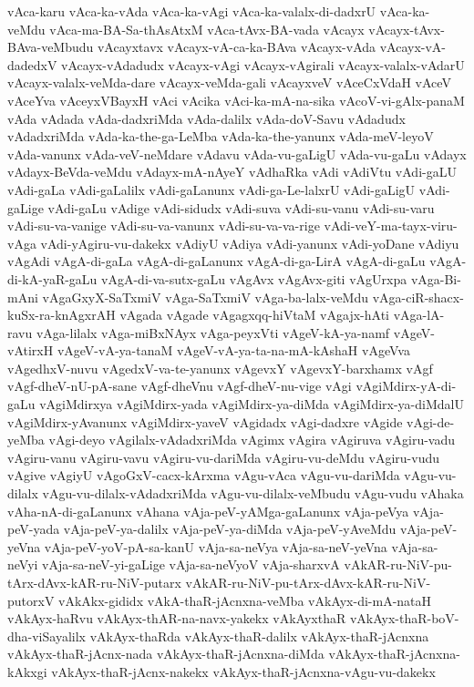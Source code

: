 {vAca-karu
vAca-ka-vAda
vAca-ka-vAgi
vAca-ka-valalx-di-dadxrU
vAca-ka-veMdu
vAca-ma-BA-Sa-thAsAtxM
vAca-tAvx-BA-vada
vAcayx
vAcayx-tAvx-BAva-veMbudu
vAcayxtavx
vAcayx-vA-ca-ka-BAva
vAcayx-vAda
vAcayx-vA-dadedxV
vAcayx-vAdadudx
vAcayx-vAgi
vAcayx-vAgirali
vAcayx-valalx-vAdarU
vAcayx-valalx-veMda-dare
vAcayx-veMda-gali
vAcayxveV
vAceCxVdaH
vAceV
vAceYva
vAceyxVBayxH
vAci
vAcika
vAci-ka-mA-na-sika
vAcoV-vi-gAlx-panaM
vAda
vAdada
vAda-dadxriMda
vAda-dalilx
vAda-doV-Savu
vAdadudx
vAdadxriMda
vAda-ka-the-ga-LeMba
vAda-ka-the-yanunx
vAda-meV-leyoV
vAda-vanunx
vAda-veV-neMdare
vAdavu
vAda-vu-gaLigU
vAda-vu-gaLu
vAdayx
vAdayx-BeVda-veMdu
vAdayx-mA-nAyeY
vAdhaRka
vAdi
vAdiVtu
vAdi-gaLU
vAdi-gaLa
vAdi-gaLalilx
vAdi-gaLanunx
vAdi-ga-Le-lalxrU
vAdi-gaLigU
vAdi-gaLige
vAdi-gaLu
vAdige
vAdi-sidudx
vAdi-suva
vAdi-su-vanu
vAdi-su-varu
vAdi-su-va-vanige
vAdi-su-va-vanunx
vAdi-su-va-va-rige
vAdi-veY-ma-tayx-viru-vAga
vAdi-yAgiru-vu-dakekx
vAdiyU
vAdiya
vAdi-yanunx
vAdi-yoDane
vAdiyu
vAgAdi
vAgA-di-gaLa
vAgA-di-gaLanunx
vAgA-di-ga-LirA
vAgA-di-gaLu
vAgA-di-kA-yaR-gaLu
vAgA-di-va-sutx-gaLu
vAgAvx
vAgAvx-giti
vAgUrxpa
vAga-Bi-mAni
vAgaGxyX-SaTxmiV
vAga-SaTxmiV
vAga-ba-lalx-veMdu
vAga-ciR-shacx-kuSx-ra-knAgxrAH
vAgada
vAgade
vAgagxqq-hiVtaM
vAgajx-hAti
vAga-lA-ravu
vAga-lilalx
vAga-miBxNAyx
vAga-peyxVti
vAgeV-kA-ya-namf
vAgeV-vAtirxH
vAgeV-vA-ya-tanaM
vAgeV-vA-ya-ta-na-mA-kAshaH
vAgeVva
vAgedhxV-nuvu
vAgedxV-va-te-yanunx
vAgevxY
vAgevxY-barxhamx
vAgf
vAgf-dheV-nU-pA-sane
vAgf-dheVnu
vAgf-dheV-nu-vige
vAgi
vAgiMdirx-yA-di-gaLu
vAgiMdirxya
vAgiMdirx-yada
vAgiMdirx-ya-diMda
vAgiMdirx-ya-diMdalU
vAgiMdirx-yAvanunx
vAgiMdirx-yaveV
vAgidadx
vAgi-dadxre
vAgide
vAgi-de-yeMba
vAgi-deyo
vAgilalx-vAdadxriMda
vAgimx
vAgira
vAgiruva
vAgiru-vadu
vAgiru-vanu
vAgiru-vavu
vAgiru-vu-dariMda
vAgiru-vu-deMdu
vAgiru-vudu
vAgive
vAgiyU
vAgoGxV-cacx-kArxma
vAgu-vAca
vAgu-vu-dariMda
vAgu-vu-dilalx
vAgu-vu-dilalx-vAdadxriMda
vAgu-vu-dilalx-veMbudu
vAgu-vudu
vAhaka
vAha-nA-di-gaLanunx
vAhana
vAja-peV-yAMga-gaLanunx
vAja-peVya
vAja-peV-yada
vAja-peV-ya-dalilx
vAja-peV-ya-diMda
vAja-peV-yAveMdu
vAja-peV-yeVna
vAja-peV-yoV-pA-sa-kanU
vAja-sa-neVya
vAja-sa-neV-yeVna
vAja-sa-neVyi
vAja-sa-neV-yi-gaLige
vAja-sa-neVyoV
vAja-sharxvA
vAkAR-ru-NiV-pu-tArx-dAvx-kAR-ru-NiV-putarx
vAkAR-ru-NiV-pu-tArx-dAvx-kAR-ru-NiV-putorxV
vAkAkx-gididx
vAkA-thaR-jAcnxna-veMba
vAkAyx-di-mA-nataH
vAkAyx-haRvu
vAkAyx-thAR-na-navx-yakekx
vAkAyxthaR
vAkAyx-thaR-boV-dha-viSayalilx
vAkAyx-thaRda
vAkAyx-thaR-dalilx
vAkAyx-thaR-jAcnxna
vAkAyx-thaR-jAcnx-nada
vAkAyx-thaR-jAcnxna-diMda
vAkAyx-thaR-jAcnxna-kAkxgi
vAkAyx-thaR-jAcnx-nakekx
vAkAyx-thaR-jAcnxna-vAgu-vu-dakekx
}
